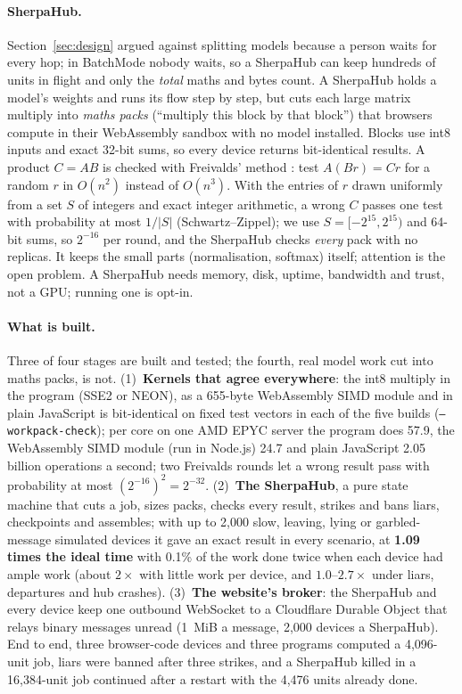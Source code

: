 \documentclass[11pt,a4paper]{article}
\theoremstyle{definition}
\theoremstyle{plain}
\begin{document}
\paragraph{SherpaHub.} Section~\ref{sec:design} argued against splitting models because a person waits for
every hop; in BatchMode nobody waits, so a SherpaHub can keep hundreds of units in flight and only the \emph{total}
maths and bytes count. A SherpaHub holds a model's weights and runs its flow step by step, but cuts each large
matrix multiply into \emph{maths packs} (``multiply this block by that block'') that browsers compute in
their WebAssembly sandbox with no model installed. Blocks use int8 inputs and exact 32-bit sums, so every
device returns bit-identical results. A product $C=AB$ is checked with Freivalds' method
\citep{freivalds1977probabilistic}: test $A(Br)=Cr$ for a random $r$ in $O(n^2)$ instead of $O(n^3)$. With the entries of $r$ drawn
uniformly from a set $S$ of integers and exact integer arithmetic, a wrong $C$ passes one test with probability
at most $1/|S|$ (Schwartz--Zippel); we use $S=[-2^{15},2^{15})$ and 64-bit sums, so $2^{-16}$ per round, and the
SherpaHub checks \emph{every} pack with no replicas. It keeps the small parts (normalisation, softmax) itself; attention is the open problem. A SherpaHub needs
memory, disk, uptime, bandwidth and trust, not a GPU; running one is opt-in.

\paragraph{What is built.} Three of four stages are built and tested; the fourth, real model work cut into
maths packs, is not. (1)~\textbf{Kernels that agree everywhere}: the int8 multiply in the program (SSE2 or NEON),
as a 655-byte WebAssembly SIMD module and in plain JavaScript is bit-identical on fixed test vectors in each of
the five builds (\texttt{--workpack-check}); per core on one AMD EPYC server the program does 57.9, the WebAssembly SIMD
module (run in Node.js) 24.7 and plain JavaScript 2.05 billion operations a second; two Freivalds rounds let a wrong result pass with
probability at most $(2^{-16})^2=2^{-32}$. (2)~\textbf{The SherpaHub}, a pure state machine that cuts a job, sizes packs,
checks every result, strikes and bans liars, checkpoints and assembles; with up to 2{,}000 slow, leaving, lying or
garbled-message simulated devices it gave an exact result in every scenario, at \textbf{1.09 times the ideal
time} with 0.1\% of the work done twice when each device had ample work (about $2\times$ with little work per
device, and $1.0$--$2.7\times$ under liars, departures and hub crashes). (3)~\textbf{The website's broker}: the SherpaHub and every device keep
one outbound WebSocket to a Cloudflare Durable Object that relays binary messages unread (1~MiB a message,
2{,}000 devices a SherpaHub). End to end, three browser-code devices and three programs computed a 4{,}096-unit
job, liars were banned after three strikes, and a SherpaHub killed in a 16{,}384-unit job continued after a
restart with the 4{,}476 units already done.
\end{document}
